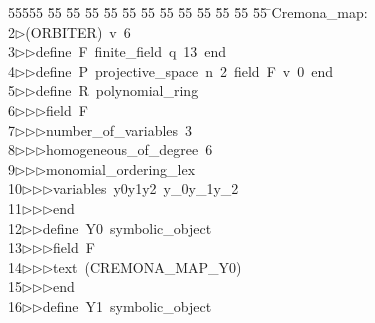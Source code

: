 %
%
\begin{tabbing}
55555 \= 55 \= 55 \= 55 \= 55 \= 55 \= 55 \= 55 \= 55 \= 55 \= 55 \= 55 \= 55 \= \>Cremona\_map:\\[0pt]
2\>$\triangleright$\>(ORBITER)\ v\ 6\ \\[0pt]
3\>$\triangleright$\>$\triangleright$\>define\ F\ finite\_field\ q\ 13\ end\ \\[0pt]
4\>$\triangleright$\>$\triangleright$\>define\ P\ projective\_space\ n\ 2\ field\ F\ v\ 0\ end\ \\[0pt]
5\>$\triangleright$\>$\triangleright$\>define\ R\ polynomial\_ring\ \\[0pt]
6\>$\triangleright$\>$\triangleright$\>$\triangleright$\>field\ F\ \\[0pt]
7\>$\triangleright$\>$\triangleright$\>$\triangleright$\>number\_of\_variables\ 3\ \\[0pt]
8\>$\triangleright$\>$\triangleright$\>$\triangleright$\>homogeneous\_of\_degree\ 6\ \\[0pt]
9\>$\triangleright$\>$\triangleright$\>$\triangleright$\>monomial\_ordering\_lex\ \\[0pt]
10\>$\triangleright$\>$\triangleright$\>$\triangleright$\>variables\ y0y1y2\ y\_0y\_1y\_2\ \\[0pt]
11\>$\triangleright$\>$\triangleright$\>$\triangleright$\>end\ \\[0pt]
12\>$\triangleright$\>$\triangleright$\>define\ Y0\ symbolic\_object\ \\[0pt]
13\>$\triangleright$\>$\triangleright$\>$\triangleright$\>field\ F\ \\[0pt]
14\>$\triangleright$\>$\triangleright$\>$\triangleright$\>text\ (CREMONA\_MAP\_Y0)\ \\[0pt]
15\>$\triangleright$\>$\triangleright$\>$\triangleright$\>end\ \\[0pt]
16\>$\triangleright$\>$\triangleright$\>define\ Y1\ symbolic\_object\ \\[0pt]

\end{tabbing}

